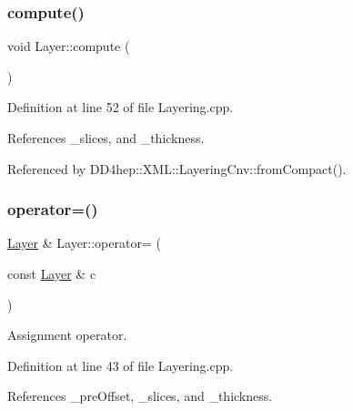 \hypertarget{class_d_d4hep_1_1_layer_a7353fc97976976a6d739e37af18954de}{}\label{class_d_d4hep_1_1_layer_a7353fc97976976a6d739e37af18954de} 
\subsubsection{\texorpdfstring{compute()}{compute()}}
{\footnotesize\ttfamily void Layer\+::compute (\begin{DoxyParamCaption}{ }\end{DoxyParamCaption})}



Definition at line 52 of file Layering.\+cpp.



References \+\_\+slices, and \+\_\+thickness.



Referenced by D\+D4hep\+::\+X\+M\+L\+::\+Layering\+Cnv\+::from\+Compact().

\hypertarget{class_d_d4hep_1_1_layer_adc08802cc74ff34cb73d593b79181394}{}\label{class_d_d4hep_1_1_layer_adc08802cc74ff34cb73d593b79181394} 
\subsubsection{\texorpdfstring{operator=()}{operator=()}}
{\footnotesize\ttfamily \hyperlink{class_d_d4hep_1_1_layer}{Layer} \& Layer\+::operator= (\begin{DoxyParamCaption}\item[{const \hyperlink{class_d_d4hep_1_1_layer}{Layer} \&}]{c }\end{DoxyParamCaption})}



Assignment operator. 



Definition at line 43 of file Layering.\+cpp.



References \+\_\+pre\+Offset, \+\_\+slices, and \+\_\+thickness.

\hypertarget{class_d_d4hep_1_1_layer_af07f933bdb0616eed97ebe0a217b1f52}{}\label{class_d_d4hep_1_1_layer_af07f933bdb0616eed97ebe0a217b1f52} 
